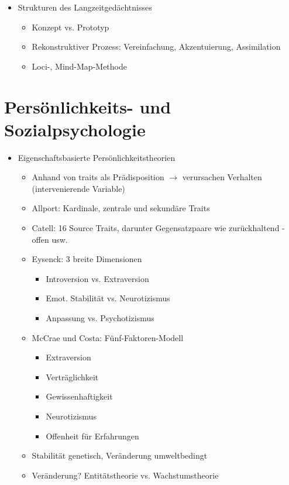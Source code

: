 \documentclass[11pt, paper=a4, twocolumn]{scrartcl}
\begin{document}
\begin{itemize}
		\item Strukturen des Langzeitgedächtnisses
			\begin{itemize}
				\item Konzept vs. Prototyp
				\item Rekonstruktiver Prozess: Vereinfachung, 
					Akzentuierung, Assimilation
				\item Loci-, Mind-Map-Methode
			\end{itemize}

	\end{itemize}
	\section{Persönlichkeits- und Sozialpsychologie}

	\begin{itemize}
		\item Eigenschaftsbasierte Persönlichkeitstheorien
			\begin{itemize}
				\item  Anhand von traits als Prädisposition $\rightarrow$ 
					verursachen Verhalten (intervenierende Variable)
				\item Allport: Kardinale, zentrale und sekundäre Traits 
				\item Catell: 16 \glqq{}Source Traits\grqq{}, darunter 
					Gegensatzpaare wie zurückhaltend - offen usw.
				\item Eysenck: 3 breite Dimensionen
					\begin{itemize}
						\item Introversion vs. Extraversion
						\item Emot. Stabilität vs. Neurotizismus
						\item Anpassung vs. Psychotizismus
					\end{itemize}
				\item McCrae und Costa: Fünf-Faktoren-Modell
					\begin{itemize}
						\item Extraversion
						\item Verträglichkeit
						\item Gewissenhaftigkeit
						\item Neurotizismus
						\item Offenheit für Erfahrungen
					\end{itemize}
				\item Stabilität genetisch, Veränderung umweltbedingt
				\item Veränderung? Entitätstheorie vs. Wachstumstheorie
			\end{itemize}


\end{itemize}
\end{document}
